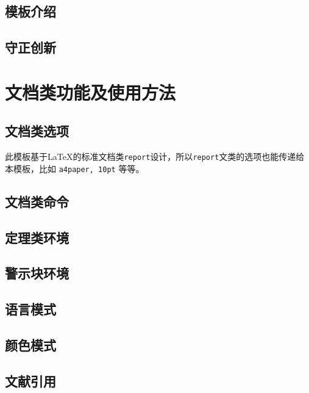 \documentclass[12pt, green, textbook]{uglyrep}
\begin{document}
\section{模板介绍}


\section{守正创新}


\chapter{文档类功能及使用方法}
\section{文档类选项}\label{ssec:classoptions}

此模板基于\LaTeX{}的标准文档类\texttt{report}设计，所以\texttt{report}文类的选项也能传递给本模板，比如 \texttt{a4paper, 10pt} 等等。



\section{文档类命令}


\section{定理类环境}


\section{警示块环境}


\section{语言模式}


\section{颜色模式}\label{ssec:colors}


\section{文献引用}

\end{document}
